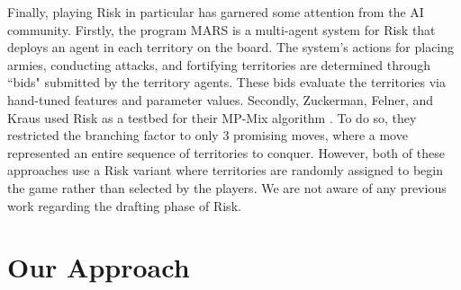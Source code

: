 \documentclass[letterpaper]{article}
\numberwithin{equation}{section}
\numberwithin{theorem}{section}
\numberwithin{lemma}{section}
\numberwithin{df}{section}
\begin{document}
Finally, playing Risk in particular has garnered some attention from the AI community.  Firstly, the program MARS \cite{RiskBots} is a multi-agent system for Risk that deploys an agent in each territory on the board.  The system's actions for placing armies, conducting attacks, and fortifying territories are determined through ``bids" submitted by the territory agents.  These bids evaluate the territories via hand-tuned features and parameter values.  Secondly, Zuckerman, Felner, and Kraus used Risk as a testbed for their MP-Mix algorithm \cite{ZuckFelnerKraus2009}.  To do so, they restricted the branching factor to only 3 promising moves, where a move represented an entire sequence of territories to conquer.  However, both of these approaches use a Risk variant where territories are randomly assigned to begin the game rather than selected by the players.  We are not aware of any previous work regarding the drafting phase of Risk.

\section{Our Approach}


\end{document}
